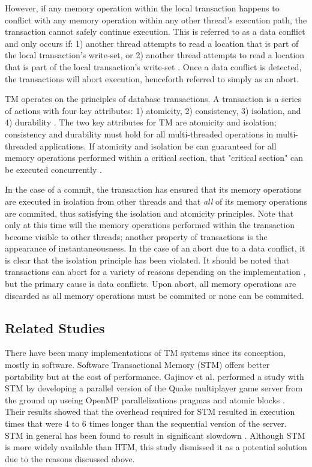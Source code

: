 \documentclass[a4paper]{article}
\begin{document}
\indent 
However, if any memory operation within the local transaction happens to  
conflict with any memory operation within any other thread's execution path, the
transaction cannot safely continue execution.  This is referred to as a data
conflict and only occurs if: 1) another thread attempts to read a location that
is part of the local transaction's write-set, or 2) another thread attempts to
read a location that is part of the local transaction's write-set
\cite{intel_prog_ref}.  Once a data conflict is detected, the transactions will
abort execution, henceforth referred to simply as an abort.
\par

\indent 
TM operates on the principles of database transactions.  A transaction
is a series of actions with four key attributes: 1) atomicity, 2) consistency,
3) isolation, and 4) durability \cite{tm_2nd}.  The two key attributes for TM
are atomicity and isolation; consistency and durability must hold for all
multi-threaded operations in multi-threaded applications.  If atomicity and
isolation be can guaranteed for all memory operations performed within a
critical section, that "critical section" can be executed concurrently
\cite{sle_rajwar}.
\par 

\indent 
In the case of a commit, the transaction has ensured that its memory
operations are executed in isolation from other threads and that \textit{all} of its
memory operations are commited, thus satisfying the isolation and
atomicity principles.  Note that only at this time will the memory operations
performed within the transaction become visible to other threads; another
property of transactions is the appearance of instantaneousness.  In the case
of an abort due to a data conflict, it is clear that the isolation principle has
been violated.  It should be noted that transactions can abort for a variety of
reasons depending on the implementation \cite{intel_opt_man,chung_amd}, but the
primary cause is data conflicts.  Upon abort, all memory operations are
discarded as all memory operations must be commited or none can be commited.
\par

\subsection{\textbf{Related Studies}}

\indent 
There have been many implementations of TM systems since its conception, mostly
in software.  Software Transactional Memory (STM) offers better portability but
at the cost of performance.  Gajinov et al. performed a study with STM by
developing a parallel version of the Quake multiplayer game server from the
ground up useing OpenMP parallelizations pragmas and atomic blocks
\cite{quake_stm}.  Their results showed that the overhead required for STM
resulted in execution times that were 4 to 6 times longer than the sequential
version of the server.  STM in general has been found to result in significant
slowdown \cite{stm_cascaval}.  Although STM is more widely available than HTM,
this study dismissed it as a potential solution due to the reasons discussed
above.
\par
\end{document}
